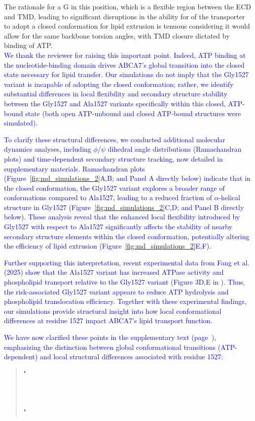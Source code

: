\documentclass[12pt]{article}
\begin{document}
The rationale for a G in this position, which is a flexible region between the ECD and TMD, leading to significant disruptions in the ability for of the transporter to adopt a closed conformation for lipid extrusion is tenuous considering it would allow for the same backbone torsion angles, with TMD closure dictated by binding of ATP.\\
\textcolor{blue}{We thank the reviewer for raising this important point. Indeed, ATP binding at the nucleotide-binding domain drives ABCA7’s global transition into the closed state necessary for lipid transfer. Our simulations do not imply that the Gly1527 variant is incapable of adopting the closed conformation; rather, we identify substantial differences in local flexibility and secondary structure stability between the Gly1527 and Ala1527 variants specifically within this closed, ATP-bound state (both open ATP-unbound and closed ATP-bound structures were simulated).} 

\textcolor{blue}{To clarify these structural differences, we conducted additional molecular dynamics analyses, including $\phi$/$\psi$ dihedral angle distributions (Ramachandran plots) and time-dependent secondary structure tracking, now detailed in supplementary materials. Ramachandran plots (Figure~\ref{fig:md_simulations_2}A,B; and Panel A directly below) indicate that in the closed conformation, the Gly1527 variant explores a broader range of conformations compared to Ala1527, leading to a reduced fraction of $\alpha$-helical structure in Gly1527  (Figure~\ref{fig:md_simulations_2}C,D; and Panel B directly below). These analysis reveal that the enhanced local flexibility introduced by Gly1527 with respect to Ala1527 significantly affects the stability of nearby secondary structure elements within the closed conformation, potentially altering the efficiency of lipid extrusion (Figure~\ref{fig:md_simulations_2}E,F).}

\textcolor{blue}{Further supporting this interpretation, recent experimental data from Fang et al. (2025) \cite{Fang2025} show that the Ala1527 variant has increased ATPase activity and phospholipid transport relative to the Gly1527 variant (Figure 3D,E in \cite{Fang2025}). Thus, the risk-associated Gly1527 variant appears to reduce ATP hydrolysis and phospholipid translocation efficiency. Together with these experimental findings, our simulations provide structural insight into how local conformational differences at residue 1527 impact ABCA7’s lipid transport function.}

\textcolor{blue}{We have now clarified these points in the supplementary text (page~\pageref{quoteM-label}), emphasizing the distinction between global conformational transitions (ATP-dependent) and local structural differences associated with residue 1527:}
\begin{quote}
	\textcolor{blue}{"}\quoteM\\\\
    \quoteN\\\\
    \quoteO\textcolor{blue}{"}
\end{quote}
\end{document}
